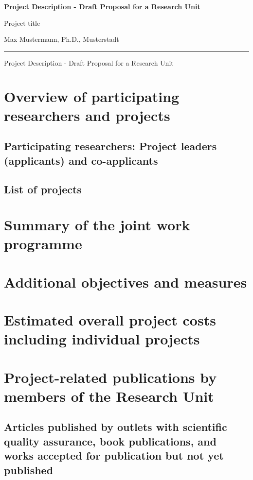 \documentclass{scrartcl}
\newcommand{\spokesperson}{Max Mustermann, Ph.D., Musterstadt}
\newcommand{\project}{Project title}
\begin{document}
{\raggedright{} \normalsize \bfseries 
	Project Description - Draft Proposal for a Research Unit \par
    \project{} \par
    \spokesperson{} \par
	\rule{\textwidth}{0.5pt} \par
	Project Description - Draft Proposal for a Research Unit
}

\section{Overview of participating researchers and projects}

\subsection{Participating researchers: Project leaders (applicants) and co-applicants}

\subsection{List of projects}


\section{Summary of the joint work programme}


\section{Additional objectives and measures}


\section{Estimated overall project costs including individual projects}

\section{Project-related publications by members of the Research Unit}

\subsection{Articles published by outlets with scientific quality assurance, book publications, and works accepted for publication but not yet published}
\printbibliography[category=reviewed, heading=none]
\end{document}
